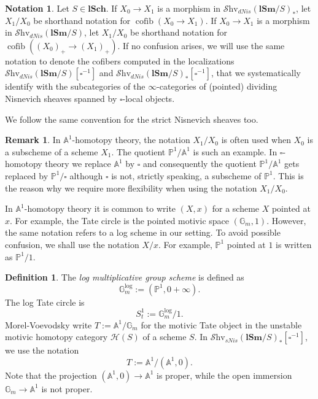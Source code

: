 \documentclass[11pt, a4paper]{amsart}
\theoremstyle{definition}
\newtheorem{df}[thm]{Definition}
\newtheorem{rmk}[thm]{Remark}
\newtheorem{notat}[thm]{Notation}
\numberwithin{equation}{subsection}
\renewcommand{\P}{\mathbb{P}}
\newcommand{\A}{\mathbb{A}}
\newcommand{\G}{{\mathbb{G}}}
\newcommand{\lSch}{\mathbf{lSch}}
\newcommand{\lSm}{\mathbf{lSm}}
\newcommand{\boxx}{\square}
\newcommand{\Gmm}{\mathbb{G}_m^{\mathrm{log}}}
\newcommand{\infShv}{\mathcal{S}\mathrm{hv}}
\newcommand{\cofib}{\operatorname{cofib}}
\begin{document}
\begin{notat}
\label{Thomdf.2} Let $S\in \lSch$. If $X_0\to X_1$ is a morphism in $\infShv_{dNis}(\lSm/S)_\ast$, 
let $X_1/X_0$ be shorthand notation for $\cofib(X_0\to X_1)$.
If $X_0\to X_1$ is a morphism in $\infShv_{dNis}(\lSm/S)$, 
let $X_1/X_0$ be shorthand notation for $\cofib((X_0)_+\to (X_1)_+)$. If no confusion arises, we will use the same notation to denote the cofibers computed in the localizations  $\infShv_{dNis}(\lSm/S)[\boxx^{-1}]$ and $\infShv_{dNis}(\lSm/S)_\ast[\boxx^{-1}]$, that we systematically identify with the subcategories of the $\infty$-categories of (pointed) dividing Nisnevich sheaves spanned by $\boxx$-local objects.

We follow the same convention for the strict Nisnevich sheaves too.
\end{notat}

\begin{rmk}
In $\A^1$-homotopy theory, the notation $X_1/X_0$ is often used when $X_0$ is a subscheme of a scheme $X_1$.
The quotient $\P^1/\A^1$ is such an example.
In $\boxx$-homotopy theory we replace $\A^1$ by $\boxx$ and consequently the quotient $\P^1/\A^1$ 
gets replaced by $\P^1/\boxx$ although $\boxx$ is not, strictly speaking, a subscheme of $\P^1$.
This is the reason why we require more flexibility when using the notation $X_1/X_0$.

In $\A^1$-homotopy theory it is common to write $(X,x)$ for a scheme $X$ pointed at $x$. 
For example, the Tate circle is the pointed motivic space $(\mathbb{G}_m,1)$.
However, 
the same notation refers to a log scheme in our setting.
To avoid possible confusion, we shall use the notation $X/x$.
For example, $\P^1$ pointed at $1$ is written as $\P^1/1$.
\end{rmk}

\begin{df}
\label{logH.26}
The \emph{log multiplicative group scheme} is defined as 
\index[notation]{Gmm @ $\Gmm$}
\[
\Gmm:=(\P^1,0+\infty).
\]
The log Tate circle 
is
\begin{equation}
\label{logH.26.1}
S_t^1
:=
\Gmm/1.
\end{equation}
Morel-Voevodsky \cite{MV} write $T:=\A^1/\G_m$ for the motivic Tate object in the unstable motivic homotopy category $\mathcal{H}(S)$ of a scheme $S$.
In $\infShv_{sNis}(\lSm/S)_\ast[\boxx^{-1}]$,
we use the notation
\begin{equation}
\label{logH.26.2}
T
:=
\A^1/(\A^1,0).
\end{equation}
Note that the projection $(\A^1,0)\to \A^1$ is proper, 
while the open immersion $\G_m\to \A^1$ is not proper.
\end{df}
\end{document}
